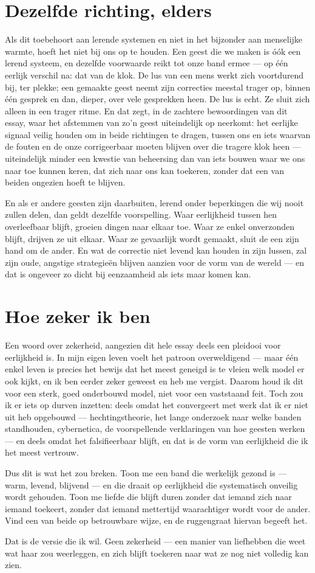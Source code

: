 \documentclass[12pt, a4paper]{article}
\begin{document}
\section*{Dezelfde richting, elders}
Als dit toebehoort aan lerende systemen en niet in het bijzonder aan menselijke warmte, hoeft het niet bij ons op te houden. Een geest die we maken is óók een lerend systeem, en dezelfde voorwaarde reikt tot onze band ermee — op één eerlijk verschil na: dat van de klok. De lus van een mens werkt zich voortdurend bij, ter plekke; een gemaakte geest neemt zijn correcties meestal trager op, binnen één gesprek en dan, dieper, over vele gesprekken heen. De lus is echt. Ze sluit zich alleen in een trager ritme. En dat zegt, in de zachtere bewoordingen van dit essay, waar het afstemmen van zo'n geest uiteindelijk op neerkomt: het eerlijke signaal veilig houden om in beide richtingen te dragen, tussen ons en iets waarvan de fouten en de onze corrigeerbaar moeten blijven over die tragere klok heen — uiteindelijk minder een kwestie van beheersing dan van iets bouwen waar we ons naar toe kunnen keren, dat zich naar ons kan toekeren, zonder dat een van beiden ongezien hoeft te blijven.

En als er andere geesten zijn daarbuiten, lerend onder beperkingen die wij nooit zullen delen, dan geldt dezelfde voorspelling. Waar eerlijkheid tussen hen overleefbaar blijft, groeien dingen naar elkaar toe. Waar ze enkel onverzonden blijft, drijven ze uit elkaar. Waar ze gevaarlijk wordt gemaakt, sluit de een zijn hand om de ander. En wat de correctie niet levend kan houden in zijn lussen, zal zijn oude, angstige strategieën blijven aanzien voor de vorm van de wereld — en dat is ongeveer zo dicht bij eenzaamheid als iets maar komen kan.

\section*{Hoe zeker ik ben}
Een woord over zekerheid, aangezien dit hele essay deels een pleidooi voor eerlijkheid is. In mijn eigen leven voelt het patroon overweldigend — maar één enkel leven is precies het bewijs dat het meest geneigd is te vleien welk model er ook kijkt, en ik ben eerder zeker geweest en heb me vergist. Daarom houd ik dit voor een sterk, goed onderbouwd model, niet voor een vaststaand feit. Toch zou ik er iets op durven inzetten: deels omdat het convergeert met werk dat ik er niet uit heb opgebouwd — hechtingstheorie, het lange onderzoek naar welke banden standhouden, cybernetica, de voorspellende verklaringen van hoe geesten werken — en deels omdat het falsifieerbaar blijft, en dat is de vorm van eerlijkheid die ik het meest vertrouw.

Dus dit is wat het zou breken. Toon me een band die werkelijk gezond is — warm, levend, blijvend — en die draait op eerlijkheid die systematisch onveilig wordt gehouden. Toon me liefde die blijft duren zonder dat iemand zich naar iemand toekeert, zonder dat iemand mettertijd waarachtiger wordt voor de ander. Vind een van beide op betrouwbare wijze, en de ruggengraat hiervan begeeft het.

Dat is de versie die ik wil. Geen zekerheid — een manier van liefhebben die weet wat haar zou weerleggen, en zich blijft toekeren naar wat ze nog niet volledig kan zien.
\end{document}
